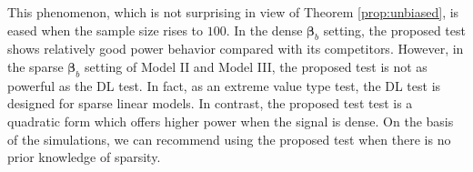 \documentclass[smallextended]{svjour3}       %
\newcommand{\bfsym}[1]{\ensuremath{\boldsymbol{#1}}}
\def\bbeta{\bfsym \beta}
\begin{document}
This phenomenon, which is not surprising in view of Theorem \ref{prop:unbiased}, is eased when the sample size rises to $100$.
In the dense $\bbeta_b$ setting, the proposed test shows relatively good power behavior compared with its competitors.
However, in the sparse $\bbeta_b$ setting of Model II and Model III, the proposed test is not as powerful as the DL test.
In fact, as an extreme value type test, the DL test is designed for sparse linear models.
In contrast, the proposed test test is a quadratic form which offers higher power when the signal is dense.
On the basis of the simulations, we can recommend using the proposed test when there is no prior knowledge of sparsity.
\end{document}
